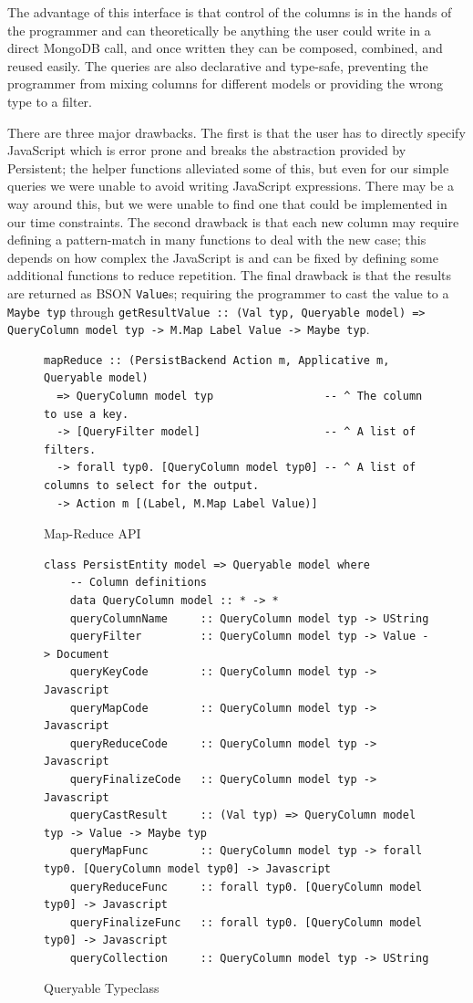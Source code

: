 \documentclass[letterpaper,twocolumn,9pt]{article}
\newcommand{\code}[1]{\texttt{#1}}
\begin{document}
The advantage of this interface is that control of the columns is in the hands of the programmer and can theoretically be anything the user could write in a direct MongoDB call, and once written they can be composed, combined, and reused easily.  The queries are also declarative and type-safe, preventing the programmer from mixing columns for different models or providing the wrong type to a filter.

There are three major drawbacks.  The first is that the user has to directly specify JavaScript which is error prone and breaks the abstraction provided by Persistent; the helper functions alleviated some of this, but even for our simple queries we were unable to avoid writing JavaScript expressions.  There may be a way around this, but we were unable to find one that could be implemented in our time constraints.  The second drawback is that each new column may require defining a pattern-match in many functions to deal with the new case; this depends on how complex the JavaScript is and can be fixed by defining some additional functions to reduce repetition.  The final drawback is that the results are returned as BSON \code{Value}s; requiring the programmer to cast the value to a \code{Maybe typ} through \code{getResultValue :: (Val typ, Queryable model) => QueryColumn model typ -> M.Map Label Value -> Maybe typ}.

\begin{figure}[t]
\footnotesize{
\begin{verbatim}
mapReduce :: (PersistBackend Action m, Applicative m, Queryable model)
  => QueryColumn model typ                 -- ^ The column to use a key.
  -> [QueryFilter model]                   -- ^ A list of filters.
  -> forall typ0. [QueryColumn model typ0] -- ^ A list of columns to select for the output.
  -> Action m [(Label, M.Map Label Value)]
\end{verbatim}
}
    \caption{Map-Reduce API}
    \label{mrapi}
\end{figure}

\begin{figure}[t]
\footnotesize{
\begin{verbatim}
class PersistEntity model => Queryable model where
    -- Column definitions
    data QueryColumn model :: * -> *
    queryColumnName     :: QueryColumn model typ -> UString
    queryFilter         :: QueryColumn model typ -> Value -> Document
    queryKeyCode        :: QueryColumn model typ -> Javascript
    queryMapCode        :: QueryColumn model typ -> Javascript
    queryReduceCode     :: QueryColumn model typ -> Javascript
    queryFinalizeCode   :: QueryColumn model typ -> Javascript
    queryCastResult     :: (Val typ) => QueryColumn model typ -> Value -> Maybe typ
    queryMapFunc        :: QueryColumn model typ -> forall typ0. [QueryColumn model typ0] -> Javascript
    queryReduceFunc     :: forall typ0. [QueryColumn model typ0] -> Javascript
    queryFinalizeFunc   :: forall typ0. [QueryColumn model typ0] -> Javascript
    queryCollection     :: QueryColumn model typ -> UString
\end{verbatim}
}
    \caption{Queryable Typeclass}
    \label{queryable}
\end{figure}
\end{document}
